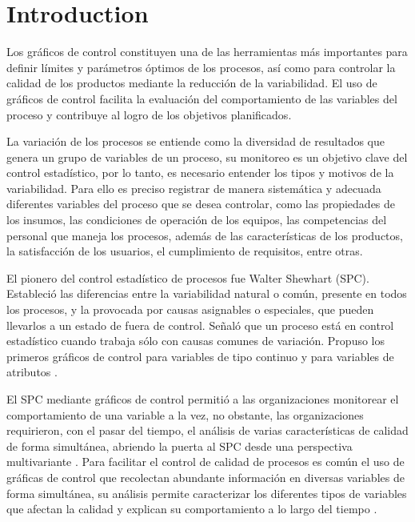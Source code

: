 \documentclass[water,article,submit,moreauthors,pdftex]{mdpi}
\begin{document}

\hypertarget{introduction}{%
\section{Introduction}\label{introduction}}

Los gráficos de control constituyen una de las herramientas más
importantes para definir límites y parámetros óptimos de los procesos,
así como para controlar la calidad de los productos mediante la
reducción de la variabilidad. El uso de gráficos de control facilita la
evaluación del comportamiento de las variables del proceso y contribuye
al logro de los objetivos planificados.

La variación de los procesos se entiende como la diversidad de
resultados que genera un grupo de variables de un proceso, su monitoreo
es un objetivo clave del control estadístico, por lo tanto, es necesario
entender los tipos y motivos de la variabilidad. Para ello es preciso
registrar de manera sistemática y adecuada diferentes variables del
proceso que se desea controlar, como las propiedades de los insumos, las
condiciones de operación de los equipos, las competencias del personal
que maneja los procesos, además de las características de los productos,
la satisfacción de los usuarios, el cumplimiento de requisitos, entre
otras.

El pionero del control estadístico de procesos fue Walter Shewhart
(SPC). Estableció las diferencias entre la variabilidad natural o común,
presente en todos los procesos, y la provocada por causas asignables o
especiales, que pueden llevarlos a un estado de fuera de control. Señaló
que un proceso está en control estadístico cuando trabaja sólo con
causas comunes de variación. Propuso los primeros gráficos de control
para variables de tipo continuo y para variables de atributos
\citep{Gutierrez2013}.

El SPC mediante gráficos de control permitió a las organizaciones
monitorear el comportamiento de una variable a la vez, no obstante, las
organizaciones requirieron, con el pasar del tiempo, el análisis de
varias características de calidad de forma simultánea, abriendo la
puerta al SPC desde una perspectiva multivariante \citep{ramos2017}.
Para facilitar el control de calidad de procesos es común el uso de
gráficas de control que recolectan abundante información en diversas
variables de forma simultánea, su análisis permite caracterizar los
diferentes tipos de variables que afectan la calidad y explican su
comportamiento a lo largo del tiempo \citep{li2012}.
\end{document}

